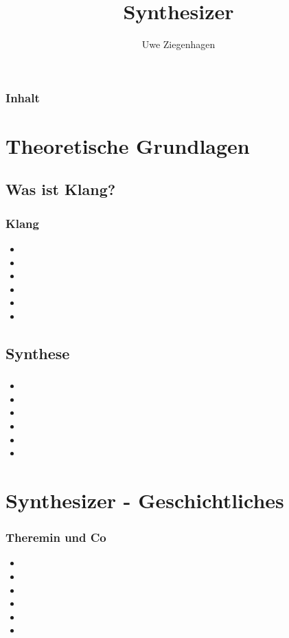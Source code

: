 \documentclass[ngerman]{beamer}
\author{Uwe Ziegenhagen}
\title{Synthesizer}
\begin{document}
 
\begin{frame}
\frametitle{Inhalt}

\tableofcontents

\end{frame}
 
\section{Theoretische Grundlagen}

\subsection{Was ist Klang?}

\begin{frame}
\frametitle{Klang}

\begin{itemize}
\item 
\item 
\item 
\item 
\item 
\item 
\end{itemize}
\end{frame}

\subsection{Synthese}

\begin{frame}
\frametitle{}


\begin{itemize}
\item 
\item 
\item 
\item 
\item 
\item 
\end{itemize}
\end{frame}
 
\section{Synthesizer - Geschichtliches}

\begin{frame}
\frametitle{Theremin und Co}


\begin{itemize}
\item 
\item 
\item 
\item 
\item 
\item 
\end{itemize}
\end{frame} 
 
\end{document}
